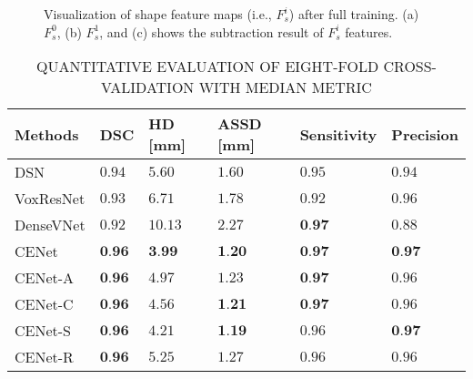 \documentclass[journal]{IEEEtran}
\begin{document}
\begin{figure}[!tb]
    
    \centering
        \hfil
        \hfil
    \caption{Visualization of shape feature maps (i.e., \(F^i_s\)) after full training. (a) \(F^0_s\), (b) \(F^1_s\), and (c) shows the subtraction result of \(F^i_s\) features.}
    \label{fig:residuals}
\end{figure}

\begin{table*}[t]%
\renewcommand{\arraystretch}{1.7}
\captionsetup{justification=centering, labelsep=newline}
\caption{QUANTITATIVE EVALUATION OF EIGHT-FOLD CROSS-VALIDATION WITH MEDIAN METRIC}
\label{table:results}
\begin{tabularx}{\textwidth}{X||>{\centering\arraybackslash}X|>{\centering\arraybackslash}X|>{\centering\arraybackslash}X|>{\centering\arraybackslash}X|>{\centering\arraybackslash}X}
Methods & DSC & HD [mm] & ASSD [mm] & Sensitivity & Precision\\
\hline
DSN \cite{dou20173d} & \(0.94\) & \(5.60\) & \(1.60\) & \(0.95\) & \(0.94\)\\
VoxResNet \cite{chen2017voxresnet} & \(0.93\) & \(6.71\) & \(1.78\) & \(0.92\) & \(0.96\)\\
DenseVNet \cite{gibson2018automatic} & \(0.92\) & \(10.13\) & \(2.27\) & \(\textbf{0.97}\) & \(0.88\)\\
CENet & \(\textbf{0.96}\) & \(\textbf{3.99}\) & \(\textbf{1.20}\) & \(\textbf{0.97}\) & \(\textbf{0.97}\)\\
CENet-A & \(\textbf{0.96}\) & \(4.97\) & \(1.23\) & \(\textbf{0.97}\) & \(0.96\)\\
CENet-C & \(\textbf{0.96}\) & \(4.56\) & \(\textbf{1.21}\) & \(\textbf{0.97}\) & \(0.96\)\\
CENet-S & \(\textbf{0.96}\) & \(4.21\) & \(\textbf{1.19}\) & \(0.96\) & \(\textbf{0.97}\)\\
CENet-R & \(\textbf{0.96}\) & \(5.25\) & \(1.27\) & \(0.96\) & \(0.96\)\\
\end{tabularx}
\end{table*}
\end{document}
